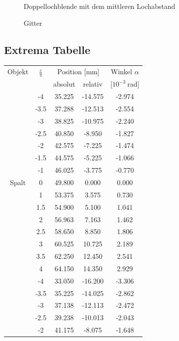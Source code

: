 \documentclass[12pt,a4paper,titlepage,headinclude,bibtotoc]{scrartcl}
\begin{document}
\begin{figure}[!htb]
	\centering
	
	\caption{Doppellochblende mit dem mittleren Lochabstand}
\end{figure}

\begin{figure}[!htb]
	\centering
	
	\caption{Gitter}
	\label{fig:gitter}
\end{figure}

\subsection{Extrema Tabelle}
\begin{table}[!htb]
	\centering
	\begin{tabular}{|c||c|c|c|c|}
		\hline		
		Objekt & $\frac{\varepsilon}{\pi}$ & \multicolumn{2}{c}{Position [mm]} & Winkel $\alpha$ \\
		& & absolut & relativ & [$10^{-3}~$rad] \\
		\hline
		\hline
		&	-4	&	35.225	&	-14.575	&	-2.974	\\
		&	-3.5	&	37.288	&	-12.513	&	-2.554	\\
		&	-3	&	38.825	&	-10.975	&	-2.240	\\
		&	-2.5	&	40.850	&	-8.950	&	-1.827	\\
		&	-2	&	42.575	&	-7.225	&	-1.474	\\
		&	-1.5	&	44.575	&	-5.225	&	-1.066	\\
		&	-1	&	46.025	&	-3.775	&	-0.770	\\
		Spalt &	0	&	49.800	&	0.000	&	0.000	\\
		&	1	&	53.375	&	3.575	&	0.730	\\
		&	1.5	&	54.900	&	5.100	&	1.041	\\
		&	2	&	56.963	&	7.163	&	1.462	\\
		&	2.5	&	58.650	&	8.850	&	1.806	\\
		&	3	&	60.525	&	10.725	&	2.189	\\
		&	3.5	&	62.250	&	12.450	&	2.541	\\
		&	4	&	64.150	&	14.350	&	2.929	\\
		\hline
		&	-4	&	33.050	&	-16.200	&	-3.306	\\
		&	-3.5	&	35.225	&	-14.025	&	-2.862	\\
		&	-3	&	37.138	&	-12.113	&	-2.472	\\
		&	-2.5	&	39.238	&	-10.013	&	-2.043	\\
		&	-2	&	41.175	&	-8.075	&	-1.648	\\

\end{tabular}
\end{table}
\end{document}

